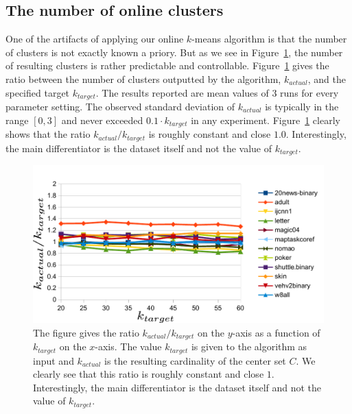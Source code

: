 \documentclass[11pt,twoside]{article}
\begin{document}
\subsection{The number of online clusters}
One of the artifacts of applying our online $k$-means algorithm is that the number of clusters is not exactly known a priory.
But as we see in Figure~\ref{fig1}, the number of resulting clusters is rather predictable and controllable.
Figure~\ref{fig1} gives the ratio between the number of clusters outputted by the algorithm, $k_{actual}$, and the specified target $k_{target}$.
The results reported are mean values of $3$ runs for every parameter setting. 
The observed standard deviation of $k_{actual}$ is typically in the range $[0,3]$ and never exceeded $0.1\cdot k_{target}$ in any experiment.
Figure~\ref{fig1} clearly shows that the ratio $k_{actual}/k_{target}$ is roughly constant and close $1.0$. 
Interestingly, the main differentiator is the dataset itself and not the value of $k_{target}$.

\begin{figure}[htbp]
\begin{center}
\includegraphics{figures/plot1.pdf}
\caption{The figure gives the ratio $k_{actual}/k_{target}$ on the $y$-axis as a function of $k_{target}$ on the $x$-axis.
The value $k_{target}$ is given to the algorithm as input and $k_{actual}$ is the resulting cardinality of the center set $C$.
We clearly see that this ratio is roughly constant and close $1$. Interestingly, the main differentiator is the dataset itself and not the value of $k_{target}$.
}
\label{fig1}
\end{center}
\end{figure}
\end{document}
